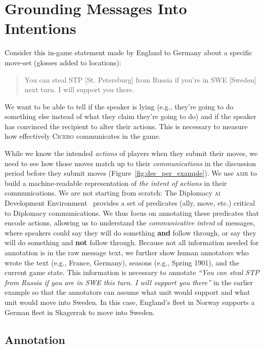 \documentclass[oneside]{memoir}
\newcommand{\cicero}{\abr{Cicero} }
\newcommand{\abr}[1]{\textsc{#1}}
\begin{document}
\section{Grounding Messages Into  Intentions}


\label{sec:amr}

Consider this in-game statement made by England to Germany about a
specific move-set (glosses added to locations):
\begin{quote}
    You can steal STP [St. Petersburg] from Russia if you’re in SWE [Sweden] next turn. I will support you there.
\end{quote}
%
We want to be able to tell if the speaker is lying (e.g., they're
going to do something else instead of what they claim they're going to
do) and if the speaker has convinced the recipient to alter their
actions.
%
This is necessary to measure how effectively \cicero{} communicates in the game.

While we know the intended \emph{actions} of players when they submit their
moves, we need to see how those moves match up to their
\emph{communications} in the discussion period before they submit
moves (Figure~\ref{fig:dec_per_example}). 
%
We use \abr{amr} to build a
machine-readable representation of \textit{the intent of actions} in their communications. 
%
We are not starting from scratch: The Diplomacy \abr{ai} Development
Environment~\cite[\abr{daide}]{DAIDE} provides a set of predicates (ally, move, etc.) critical to Diplomacy communications.
%
We thus focus on annotating these predicates that encode actions, allowing us to understand the \emph{communicative intent} of messages, where speakers could say they will do something \textbf{and} follow through, or say they will do something and \textbf{not} follow through.
% 
Because not all information needed for annotation is in the
raw message text, we further show human annotators who wrote the text (e.g., France,
Germany), seasons (e.g., Spring 1901), and the current game state.
%
This information is necessary to annotate \textit{``You can steal
  STP from Russia if you are in SWE this turn. I will support you there''} in the earlier example so that the annotators can assume what unit would support and what unit would move into Sweden.
%
In this case, England's fleet in Norway supports a German fleet in Skagerrak to move into Sweden.

\subsection{Annotation}
\label{sec:amr_annotation}
\end{document}
